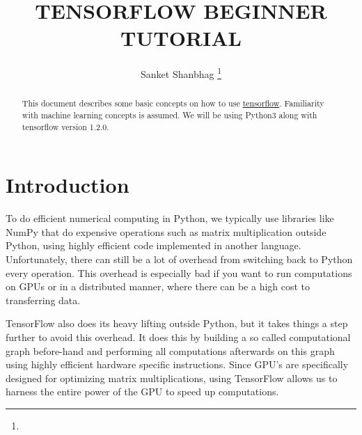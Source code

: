 \documentclass[Proceedings]{ascelike}
\begin{document}
%
\title{TENSORFLOW BEGINNER TUTORIAL}
%
\author{
Sanket Shanbhag
%
\thanks{}
%
%
%
%
%
%
}
%
\maketitle
%
\begin{abstract}
This document describes some basic concepts on how to use \href{https://www.tensorflow.org/install/}{tensorflow}.
Familiarity with machine learning concepts is assumed. We will be using Python3 along with tensorflow version 1.2.0.
\end{abstract}
%
%

%
\section{Introduction}
To do efficient numerical computing in Python, we typically use libraries like NumPy that do expensive operations such as matrix multiplication outside Python, using highly efficient code implemented in another language. Unfortunately, there can still be a lot of overhead from switching back to Python every operation. This overhead is especially bad if you want to run computations on GPUs or in a distributed manner, where there can be a high cost to transferring data.

TensorFlow also does its heavy lifting outside Python, but it takes things a step further to avoid this overhead. It does this by building a so called computational graph before-hand and performing all computations afterwards on this graph using highly efficient hardware specific instructions. Since GPU's are specifically designed for optimizing matrix multiplications, using TensorFlow allows us to harness the entire power of the GPU to speed up computations. 
\end{document}
